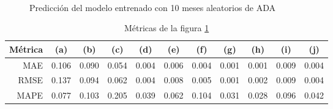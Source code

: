 \documentclass[a4paper,10pt]{article}
\begin{document}
\begin{figure}[h]
    \\
  \caption{Predicción del modelo entrenado con 10 meses aleatorios de ADA}
  \label{f:ada_mth_arima}
\end{figure}

\begin{table}[h]
 \begin{center}
  \begin{tabular}{|r|c|c|c|c|c|c|c|c|c|c|}
    Métrica & (a) & (b) & (c) & (d) & (e) & (f) & (g) & (h) & (i) & (j) \\ \hline
    MAE & 0.106 & 0.090 & 0.054 & 0.004 & 0.006 & 0.004 & 0.001 & 0.001 & 0.009 & 0.004 \\
    RMSE & 0.137 & 0.094 & 0.062 & 0.004 & 0.008 & 0.005 & 0.001 & 0.002 & 0.009 & 0.004\\
    MAPE & 0.077 & 0.103 & 0.205 & 0.039 & 0.062 & 0.104 & 0.031 & 0.028 & 0.096 & 0.042 \\ \hline
  \end{tabular}
  \caption{Métricas de la figura \ref{f:ada_mth_arima}}
  \label{tab:ada_m}
 \end{center}
\end{table}
\end{document}
